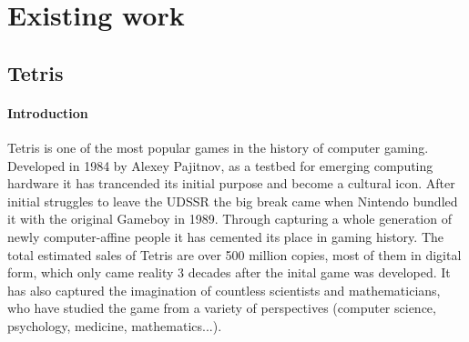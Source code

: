 \documentclass{article}
\begin{document}
\section{Existing work}
\subsection{Tetris}
\paragraph{Introduction}
Tetris is one of the most popular games in the history of computer gaming. Developed in 1984 by Alexey Pajitnov, as a testbed for emerging computing hardware it has trancended its initial purpose and become a cultural icon. 
After initial struggles to leave the UDSSR the big break came when Nintendo bundled it with the original Gameboy in 1989. 
Through capturing a whole generation of newly computer-affine people it has cemented its place in gaming history. The total estimated sales of Tetris are over 500 million copies, most of them in digital form, which only came reality 3 decades after the inital game was developed.
It has also captured the imagination of countless scientists and mathematicians, who have studied the game from a variety of perspectives (computer science, psychology, medicine, mathematics...).
\end{document}
